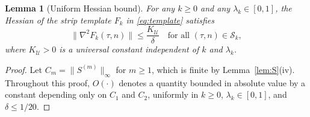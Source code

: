 \documentclass[11pt]{article}
\newtheorem{lemma}[theorem]{Lemma}
\begin{document}
\begin{lemma}[Uniform Hessian bound]
\label{lem:hessU}
For any $k\ge0$ and any $\lambda_k\in[0,1]$, the Hessian of the strip template $F_k$ in \eqref{eq:template} satisfies
\begin{equation}
\label{eq:hessU}
\|\nabla^2 F_k(\tau,n)\|\le\frac{K_{\mathcal U}}{\delta}
\quad\text{for all }(\tau,n)\in\mathcal S_k,
\end{equation}
where $K_{\mathcal U} > 0$ is a universal constant independent of $k$ and $\lambda_k$.
\end{lemma}

\begin{proof}
Let $C_m = \|S^{(m)}\|_\infty$ for $m \ge 1$, which is finite by Lemma~\ref{lem:S}(iv).
Throughout this proof, $O(\cdot)$ denotes a quantity bounded in absolute value by a constant depending only on $C_1$ and $C_2$, uniformly in $k \ge 0$, $\lambda_k \in [0, 1]$, and $\delta \le 1/20$.


\end{proof}
\end{document}
